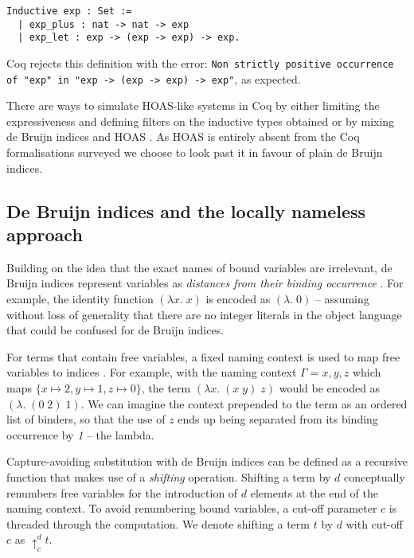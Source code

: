 \documentclass[]{unswthesis}
\let\c\texttt
\begin{document}
\begin{verbatim}
Inductive exp : Set :=
  | exp_plus : nat -> nat -> exp
  | exp_let : exp -> (exp -> exp) -> exp.
\end{verbatim}

Coq rejects this definition with the error: \c{Non strictly positive occurrence of "exp" in
 "exp -> (exp -> exp) -> exp"}, as expected.
 
There are ways to simulate HOAS-like systems in Coq by either limiting the expressiveness and defining filters on the inductive types obtained \cite{despeyroux95} or by mixing de Bruijn indices and HOAS \cite{capretta07}. As HOAS is entirely absent from the Coq formalisations surveyed we choose to look past it in favour of plain de Bruijn indices.

\subsection{De Bruijn indices and the locally nameless approach}
\label{sec:de_bruijn}

Building on the idea that the exact names of bound variables are irrelevant, de Bruijn indices represent variables as \textit{distances from their binding occurrence} \cite{deBruijn72}. For example, the identity function $(\lambda x. \; x)$ is encoded as $(\lambda . \; 0)$ -- assuming without loss of generality that there are no integer literals in the object language that could be confused for de Bruijn indices.

For terms that contain free variables, a fixed naming context is used to map free variables to indices \cite{tapl}. For example, with the naming context $\Gamma = x, y, z$ which maps $\{x \mapsto 2, y \mapsto 1, z \mapsto 0\}$, the term $(\lambda x. \; (x \; y) \; z)$ would be encoded as $(\lambda. \; (0 \; 2) \; 1)$. We can imagine the context prepended to the term as an ordered list of binders, so that the use of $z$ ends up being separated from its binding occurrence by \textit{1} -- the lambda.

Capture-avoiding substitution with de Bruijn indices can be defined as a recursive function that makes use of a \textit{shifting} operation. Shifting a term by $d$ conceptually renumbers free variables for the introduction of $d$ elements at the end of the naming context. To avoid renumbering bound variables, a cut-off parameter $c$ is threaded through the computation. We denote shifting a term $t$ by $d$ with cut-off $c$ as $\uparrow^d_c t$.
\end{document}

